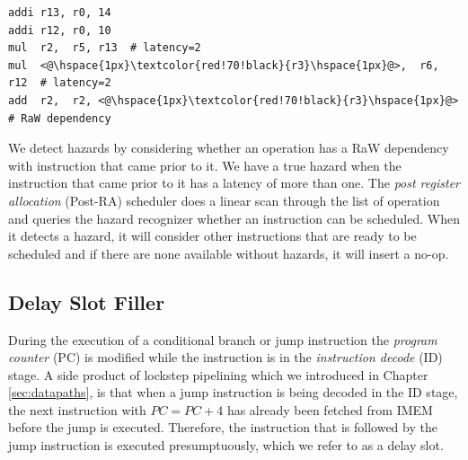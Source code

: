 \lstset{style=customasm}
\begin{lstlisting}
addi r13, r0, 14
addi r12, r0, 10
mul  r2,  r5, r13  # latency=2
mul  <@\hspace{1px}\textcolor{red!70!black}{r3}\hspace{1px}@>,  r6, r12  # latency=2
add  r2,  r2, <@\hspace{1px}\textcolor{red!70!black}{r3}\hspace{1px}@>   # RaW dependency
\end{lstlisting}

We detect hazards by considering whether an operation has a RaW dependency with instruction that came prior to it. We have a true hazard when the instruction that came prior to it has a latency of more than one. The \emph{post register allocation} (Post-RA) scheduler does a linear scan through the list of operation and queries the hazard recognizer whether an instruction can be scheduled. When it detects a hazard, it will consider other instructions that are ready to be scheduled and if there are none available without hazards, it will insert a no-op.

\subsection{Delay Slot Filler}
During the execution of a conditional branch or jump instruction the \emph{program counter} (PC) is modified while the instruction is in the \emph{instruction decode} (ID) stage. A side product of lockstep pipelining which we introduced in Chapter \ref{sec:datapaths}, is that when a jump instruction is being decoded in the ID stage, the next instruction with $PC = PC+4$ has already been fetched from IMEM before the jump is executed. Therefore, the instruction that is followed by the jump instruction is executed presumptuously, which we refer to as a delay slot.


